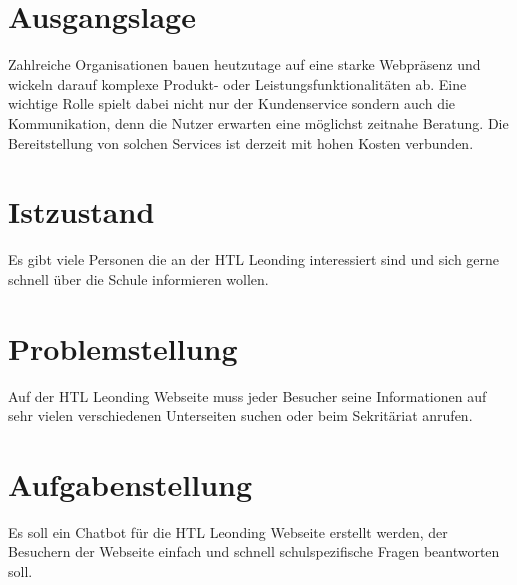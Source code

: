 \section{Ausgangslage}
Zahlreiche Organisationen bauen heutzutage auf eine starke Webpräsenz und wickeln darauf komplexe Produkt- oder Leistungsfunktionalitäten ab. Eine wichtige Rolle spielt dabei nicht nur der Kundenservice sondern auch die Kommunikation, denn die Nutzer erwarten eine möglichst zeitnahe Beratung. Die Bereitstellung von solchen Services ist derzeit mit hohen Kosten verbunden.

\section{Istzustand}
Es gibt viele Personen die an der HTL Leonding interessiert sind und sich gerne schnell über die Schule informieren wollen.


\section{Problemstellung}
Auf der HTL Leonding Webseite muss jeder Besucher seine Informationen auf sehr vielen verschiedenen Unterseiten suchen oder beim Sekritäriat anrufen.

\section{Aufgabenstellung}
Es soll ein Chatbot für die HTL Leonding Webseite erstellt werden, der Besuchern der Webseite einfach und schnell schulspezifische Fragen beantworten soll.

